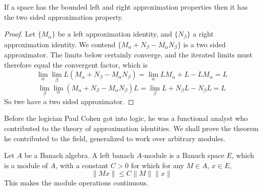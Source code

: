 \begin{lemma}
    If a space has the bounded left and right approximation properties then it has the two sided approximation property.
\end{lemma}
\begin{proof}
    Let $\{ M_\alpha \}$ be a left approximation identity, and $\{ N_\beta \}$ a right approximation identity. We contend $\{ M_\alpha + N_\beta - M_\alpha N_\beta \}$ is a two sided approximator. The limits below certainly converge, and the iterated limits must therefore equal the convergent factor, which is
    \[ \lim_\alpha \lim_\beta L(M_\alpha + N_\beta - M_\alpha N_\beta) = \lim_\alpha LM_\alpha + L - LM_\alpha = L \]
    \[ \lim_\beta \lim_\alpha (M_\alpha + N_\beta - M_\alpha N_\beta)L = \lim_\beta L + N_\beta L - N_\beta L = L \]
    So twe have a two sided approximator.
\end{proof}

Before the logician Paul Cohen got into logic, he was a functional analyst who contributed to the theory of approximation identities. We shall prove the theorem he contributed to the field, generalized to work over arbitrary modules.

\begin{definition}
    Let $A$ be a Banach algebra. A left banach $A$-module is a Banach space $E$, which is a module of $A$, with a constant $C > 0$ for which for any $M \in A$, $x \in E$,
    \[ \| Mx \| \leq C \| M \| \| x \| \]
    This makes the module operations continuous.
\end{definition}

